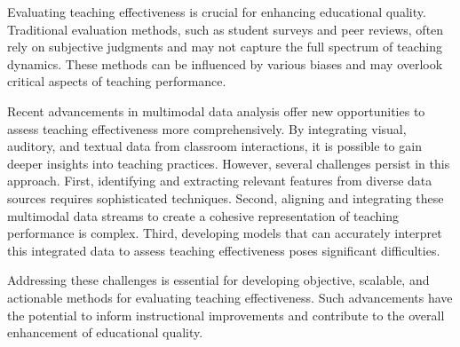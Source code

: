 Evaluating teaching effectiveness is crucial for enhancing educational quality. Traditional evaluation methods, such as student surveys and peer reviews, often rely on subjective judgments and may not capture the full spectrum of teaching dynamics. These methods can be influenced by various biases and may overlook critical aspects of teaching performance.

Recent advancements in multimodal data analysis offer new opportunities to assess teaching effectiveness more comprehensively. By integrating visual, auditory, and textual data from classroom interactions, it is possible to gain deeper insights into teaching practices. However, several challenges persist in this approach. First, identifying and extracting relevant features from diverse data sources requires sophisticated techniques. Second, aligning and integrating these multimodal data streams to create a cohesive representation of teaching performance is complex. Third, developing models that can accurately interpret this integrated data to assess teaching effectiveness poses significant difficulties.

Addressing these challenges is essential for developing objective, scalable, and actionable methods for evaluating teaching effectiveness. Such advancements have the potential to inform instructional improvements and contribute to the overall enhancement of educational quality.
